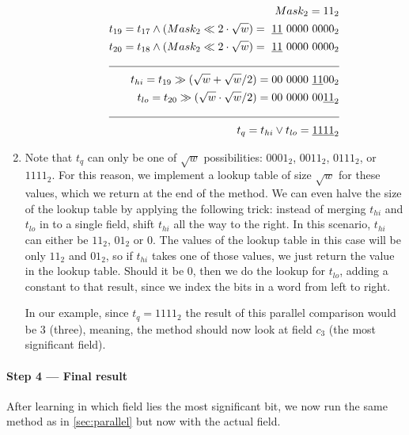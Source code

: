 \begin{enumerate}
\begin{enumerate}
        \begin{align*}
            Mask_2 = 11_2&\\
            t_{19} = t_{17} \wedge (Mask_2 \ll 2\cdot \sqrt{w}) =\ \underline{11}\ 0000\ 0000_2& \\
            t_{20} = t_{18} \wedge (Mask_2 \ll 2\cdot \sqrt{w}) =\ \underline{11}\ 0000\ 0000_2& \\
            \cline{1-2}
            t_{hi} = t_{19} \gg (\sqrt{w} + \sqrt{w}/2) = 00\ 0000\ \underline{11}00_2 &\\
            t_{lo} = t_{20} \gg (\sqrt{w} \cdot \sqrt{w} / 2) = 00\ 0000\ 00 \underline{11}_2 &\\
            \cline{1-2}
            t_{q} = t_{hi} \vee t_{lo} = \underline{1111}_2 &\\
        \end{align*}
    \end{enumerate}
    \item
    Note that $t_q$ can only be one of $\sqrt{w}$ possibilities: $0001_2$, $0011_2$, $0111_2$, or $1111_2$. For this reason, we implement a lookup table of size $\sqrt{w}$ for these values, which we return at the end of the method. We can even halve the size of the lookup table by applying the following trick: instead of merging $t_{hi}$ and $t_{lo}$ in to a single field, shift $t_{hi}$ all the way to the right. In this scenario, $t_{hi}$ can either be $11_2$, $01_2$ or $0$. The values of the lookup table in this case will be only $11_2$ and $01_2$, so if $t_{hi}$ takes one of those values, we just return the value in the lookup table. Should it be $0$, then we do the lookup for $t_{lo}$, adding a constant to that result, since we index the bits in a word from left to right.
    
    In our example, since $t_{q} = 1111_2$ the result of this parallel comparison would be $3$ (three), meaning, the method should now look at field $c_3$ (the most significant field).
\end{enumerate}

\paragraph{Step 4 --- Final result}
After learning in which field lies the most significant bit, we now run the same method as in \ref{sec:parallel} but now with the actual field.

